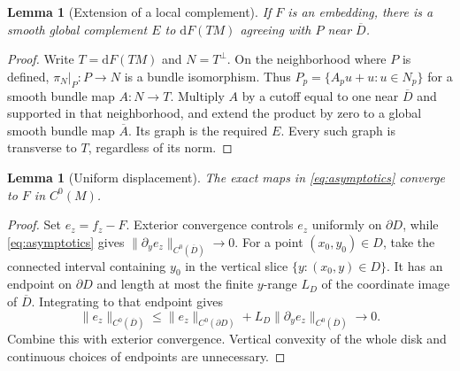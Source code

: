 \documentclass[11pt,a4paper]{article}
\newcommand{\dd}{\mathrm d}
\newtheorem{lemma}[theorem]{Lemma}
\theoremstyle{definition}
\theoremstyle{remark}
\numberwithin{equation}{section}
\begin{document}
\begin{lemma}[Extension of a local complement]
\label{lem:extend}
If $F$ is an embedding, there is a smooth global complement $E$ to
$\dd F(TM)$ agreeing with $P$ near $\overline D$.
\end{lemma}
\begin{proof}
Write $T=\dd F(TM)$ and $N=T^\perp$. On the neighborhood where $P$
is defined, $\pi_N|_P:P\to N$ is a bundle isomorphism. Thus
$P_p=\{A_pu+u:u\in N_p\}$ for a smooth bundle map $A:N\to T$.
Multiply $A$ by a cutoff equal to one near $\overline D$ and supported
in that neighborhood, and extend the product by zero to a global
smooth bundle map $\overline A$. Its graph is the required $E$.
Every such graph is transverse to $T$, regardless of its norm.
\end{proof}

\begin{lemma}[Uniform displacement]
\label{lem:displacement}
The exact maps in \eqref{eq:asymptotics} converge to $F$ in $C^0(M)$.
\end{lemma}
\begin{proof}
Set $e_z=f_z-F$. Exterior convergence controls $e_z$ uniformly on
$\partial D$, while \eqref{eq:asymptotics} gives
$\|\partial_y e_z\|_{C^0(\overline D)}\to0$.
For a point $(x_0,y_0)\in D$, take the connected interval containing
$y_0$ in the vertical slice $\{y:(x_0,y)\in D\}$.
It has an endpoint on $\partial D$ and length at most the finite
$y$-range $L_D$ of the coordinate image of $\overline D$.
Integrating to that endpoint gives
\begin{equation}
 \|e_z\|_{C^0(\overline D)}\le
 \|e_z\|_{C^0(\partial D)}+
 L_D\|\partial_y e_z\|_{C^0(\overline D)}\longrightarrow0.
 \label{eq:displacement}
\end{equation}
Combine this with exterior convergence. Vertical convexity of the
whole disk and continuous choices of endpoints are unnecessary.
\end{proof}
\end{document}
